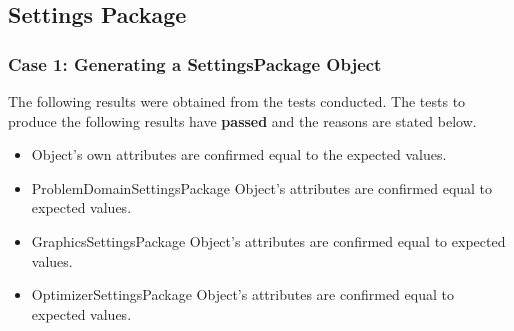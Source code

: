 \documentclass[11pt]{article}
\begin{document}
\subsection{Settings Package}
\subsubsection{Case 1: Generating a SettingsPackage Object}
The following results were obtained from the tests conducted. The tests to produce the
following results have \textbf{passed} and the reasons are stated below.

\begin{itemize}
	\item Object's own attributes are confirmed equal to the expected values.
	\item ProblemDomainSettingsPackage Object's attributes are confirmed equal to expected values.
	\item GraphicsSettingsPackage Object's attributes are confirmed equal to expected values.
	\item OptimizerSettingsPackage Object's attributes are confirmed equal to expected values.
\end{itemize}
\end{document}
